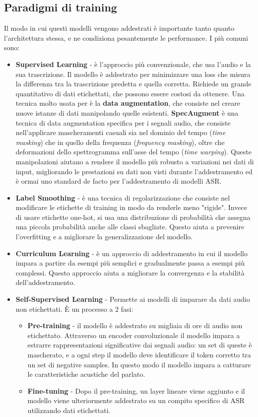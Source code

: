 \documentclass[12pt, a4paper]{article}
\begin{document}
\subsection{Paradigmi di training}

Il modo in cui questi modelli vengono addestrati è importante tanto quanto l'architettura stessa, e ne condiziona pesantemente le performance. I più comuni sono:
\begin{itemize}
  \item \textbf{Supervised Learning} - è l'approccio più convenzionale, che usa l'audio e la sua trascrizione. Il modello è addestrato per minimizzare una loss che misura la differenza tra la trascrizione predetta e quella corretta. Richiede un grande quantitativo di dati etichettati, che possono essere costosi da ottenere. Una tecnica molto usata per è la \textbf{data augmentation}, che consiste nel creare nuove istanze di dati manipolando quelle esistenti. \textbf{SpecAugment} è una tecnica di data augmentation specifica per i segnali audio, che consiste nell'applicare mascheramenti casuali sia nel dominio del tempo (\emph{time masking}) che in quello della frequenza (\emph{frequency masking}), oltre che deformazioni dello spettrogramma sull'asse del tempo (\emph{time warping}). Queste manipolazioni aiutano a rendere il modello più robusto a variazioni nei dati di input, migliorando le prestazioni su dati non visti durante l'addestramento ed è ormai uno standard de facto per l'addestramento di modelli ASR.
  \item \textbf{Label Smoothing} - è una tecnica di regolarizzazione che consiste nel modificare le etichette di training in modo da renderle meno "rigide". Invece di usare etichette one-hot, si usa una distribuzione di probabilità che assegna una piccola probabilità anche alle classi sbagliate. Questo aiuta a prevenire l'overfitting e a migliorare la generalizzazione del modello.
  \item \textbf{Curriculum Learning} - è un approccio di addestramento in cui il modello impara a partire da esempi più semplici e gradualmente passa a esempi più complessi. Questo approccio aiuta a migliorare la convergenza e la stabilità dell'addestramento.
  \item \textbf{Self-Supervised Learning} - Permette ai modelli di imparare da dati audio non etichettati. È un processo a 2 fasi:
    \begin{itemize}
      \item \textbf{Pre-training} - il modello è addestrato su migliaia di ore di audio non etichettato. Attraverso un encoder convoluzionale il modello impara a estrarre rappresentazioni significative dai segnali audio: un set di queste è mascherato, e a ogni step il modello deve identificare il token corretto tra un set di negative samples. In questo modo il modello impara a catturare le caratteristiche acustiche del parlato.
      \item \textbf{Fine-tuning} - Dopo il pre-training, un layer lineare viene aggiunto e il modello viene ulteriormente addestrato su un compito specifico di ASR utilizzando dati etichettati.
    \end{itemize}


\end{itemize}
\end{document}
